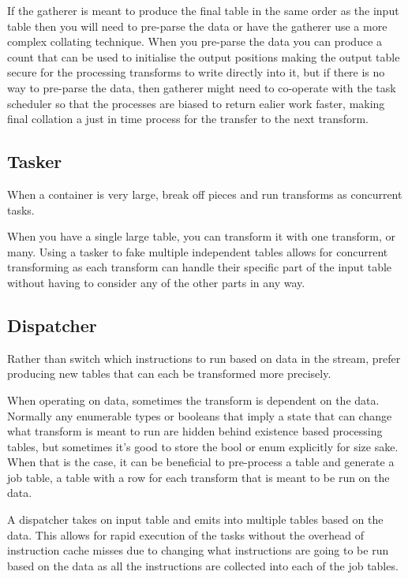 If the gatherer is meant to produce the final table in the same order as the
input table then you will need to pre-parse the data or have the gatherer use a
more complex collating technique. When you pre-parse the data you can produce a
count that can be used to initialise the output positions making the output
table secure for the processing transforms to write directly into it, but if
there is no way to pre-parse the data, then gatherer might need to co-operate
with the task scheduler so that the processes are biased to return ealier work
faster, making final collation a just in time process for the transfer to the
next transform.

\subsection{Tasker}

When a container is very large, break off pieces and run transforms as
concurrent tasks.

When you have a single large table, you can transform it with one transform, or
many. Using a tasker to fake multiple independent tables allows for concurrent
transforming as each transform can handle their specific part of the input
table without having to consider any of the other parts in any way.

\subsection{Dispatcher}

Rather than switch which instructions to run based on data in the stream,
prefer producing new tables that can each be transformed more precisely.

When operating on data, sometimes the transform is dependent on the data.
Normally any enumerable types or booleans that imply a state that can change
what transform is meant to run are hidden behind existence based processing
tables, but sometimes it's good to store the bool or enum explicitly for size
sake. When that is the case, it can be beneficial to pre-process a table and
generate a job table, a table with a row for each transform that is meant to be
run on the data.

A dispatcher takes on input table and emits into multiple tables based on the
data. This allows for rapid execution of the tasks without the overhead of
instruction cache misses due to changing what instructions are going to be run
based on the data as all the instructions are collected into each of the job
tables.

